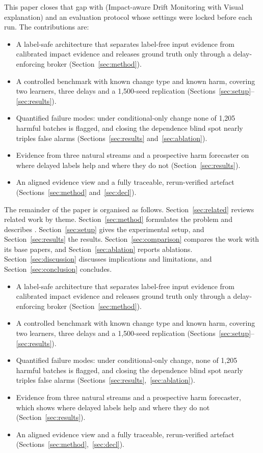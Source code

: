 This paper closes that gap with \idm{} (Impact-aware Drift Monitoring with Visual
explanation) and an evaluation protocol whose settings were locked before each run. The contributions are:
\begin{itemize}
  \item A label-safe architecture that separates label-free input evidence from
  calibrated impact evidence and releases ground truth only through a delay-enforcing
  broker (Section~\ref{sec:method}).
  \item A controlled benchmark with known change type and known harm, covering two
  learners, three delays and a 1,500-seed replication (Sections~\ref{sec:setup}--\ref{sec:results}).
  \item Quantified failure modes: under conditional-only change none of 1,205 harmful
  batches is flagged, and closing the dependence blind spot nearly triples false
  alarms (Sections~\ref{sec:results} and~\ref{sec:ablation}).
  \item Evidence from three natural streams and a prospective harm forecaster on where
  delayed labels help and where they do not (Section~\ref{sec:results}).
  \item An aligned evidence view and a fully traceable, rerun-verified artefact
  (Sections~\ref{sec:method} and~\ref{sec:decl}).
\end{itemize}

The remainder of the paper is organised as follows.
Section~\ref{sec:related} reviews related work by theme. Section~\ref{sec:method}
formulates the problem and describes \idm{}. Section~\ref{sec:setup} gives the
experimental setup, and Section~\ref{sec:results} the results. Section~\ref{sec:comparison}
compares the work with its base papers, and Section~\ref{sec:ablation} reports
ablations. Section~\ref{sec:discussion} discusses implications and limitations, and
Section~\ref{sec:conclusion} concludes.\begin{itemize}
  \item A label-safe architecture that separates label-free input evidence from
  calibrated impact evidence and releases ground truth only through a delay-enforcing
  broker (Section~\ref{sec:method}).
  \item A controlled benchmark with known change type and known harm, covering two
  learners, three delays and a 1,500-seed replication (Sections~\ref{sec:setup}--\ref{sec:results}).
  \item Quantified failure modes: under conditional-only change, none of 1,205 harmful
  batches is flagged, and closing the dependence blind spot nearly triples false
  alarms (Sections~\ref{sec:results},~\ref{sec:ablation}).
  \item Evidence from three natural streams and a prospective harm forecaster, which
  shows where delayed labels help and where they do not (Section~\ref{sec:results}).
  \item An aligned evidence view and a fully traceable, rerun-verified artefact
  (Sections~\ref{sec:method},~\ref{sec:decl}).
\end{itemize}

